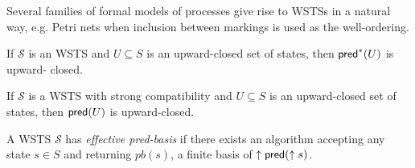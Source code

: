 Several families of formal models of processes give rise to WSTSs in a natural way, e.g. Petri nets when inclusion between markings is used as the well-ordering.



\begin{proposition}\cite{DBLP:journals/tcs/FinkelS01}
If $\mathscr{S}$ is an WSTS and $U \subseteq S$ is an upward-closed set of states, then $\textsf{pred}^*(U )$ is upward-
closed.
\end{proposition}

\iffalse
Proof. Assume $s \in \pred^* (U )$. Then $s \rightarrow^* t$ for some $t \in U $. If now $s' \geq s$ then upward-compatibility entails that $s' \rightarrow^* t'$ for some $t' \geq t$. Then $t' \in U$ and $s' \in \pred^*(U )$.
\fi

\begin{proposition}\cite{DBLP:journals/tcs/FinkelS01}
If $\mathscr{S}$ is a WSTS with strong compatibility and $U \subseteq S$ is an upward-closed set of states, then $\textsf{pred}(U )$ is upward-closed.
\end{proposition}
\iffalse
Proof. Assume $s \in \pred (I )$. Then $s \rightarrow t$ for some $t \in I $. If now $s' \geq s$ then strong upward-compatibility entails that $s' \rightarrow t'$ for some $t' \geq t$. Then $t' \in I$ and $s' \in \pred(I )$.
\fi
{}



\begin{definition}\cite{DBLP:journals/iandc/AbdullaCJT00}
A WSTS $\mathscr{S}$ has {\em effective pred-basis} if there exists an algorithm accepting
any state $s \in S$ and returning $pb(s)$, a finite basis of $\uparrow \textsf{pred}(\uparrow s)$.
\end{definition}



